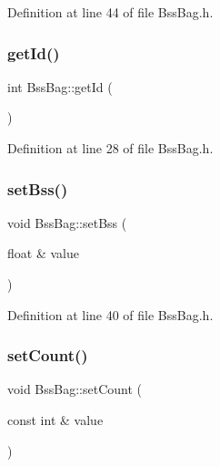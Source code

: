 Definition at line 44 of file Bss\+Bag.\+h.

\mbox{\label{class_bss_bag_a3a5526da6d1ee974b30dfd3fbd1614a5}} 
\subsubsection{\texorpdfstring{get\+Id()}{getId()}}
{\footnotesize\ttfamily int Bss\+Bag\+::get\+Id (\begin{DoxyParamCaption}{ }\end{DoxyParamCaption})\hspace{0.3cm}{\ttfamily [inline]}}



Definition at line 28 of file Bss\+Bag.\+h.

\mbox{\label{class_bss_bag_a4af9c2093b7db7000eb56e45a3e4b282}} 
\subsubsection{\texorpdfstring{set\+Bss()}{setBss()}}
{\footnotesize\ttfamily void Bss\+Bag\+::set\+Bss (\begin{DoxyParamCaption}\item[{float \&}]{value }\end{DoxyParamCaption})\hspace{0.3cm}{\ttfamily [inline]}}



Definition at line 40 of file Bss\+Bag.\+h.

\mbox{\label{class_bss_bag_ad5faad808217f303c617078ddfa0c009}} 
\subsubsection{\texorpdfstring{set\+Count()}{setCount()}}
{\footnotesize\ttfamily void Bss\+Bag\+::set\+Count (\begin{DoxyParamCaption}\item[{const int \&}]{value }\end{DoxyParamCaption})\hspace{0.3cm}{\ttfamily [inline]}}



